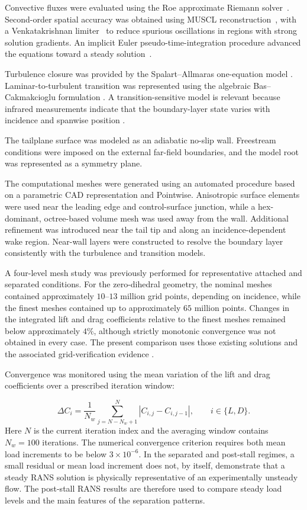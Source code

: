 \documentclass[journal ]{new-aiaa}
\begin{document}
Convective fluxes were evaluated using the Roe approximate Riemann solver~\citep{Roe1981}. Second-order spatial accuracy was obtained using MUSCL reconstruction~\citep{van1979towards}, with a Venkatakrishnan limiter~\citep{venkatakrishnan1993accuracy} to reduce spurious oscillations in regions with strong solution gradients. An implicit Euler pseudo-time-integration procedure advanced the equations toward a steady solution~\citep{palacios2013stanford}.

Turbulence closure was provided by the Spalart--Allmaras one-equation model \citep{spalart1992sa}. Laminar-to-turbulent transition was represented using the algebraic Bas--Cakmakcioglu formulation \citep{cakmakcioglu2020bcm}. A transition-sensitive model is relevant because infrared measurements indicate that the boundary-layer state varies with incidence and spanwise position \citep{ZanottiEtAl2022}.

The tailplane surface was modeled as an adiabatic no-slip wall. Freestream conditions were imposed on the external far-field boundaries, and the model root was represented as a symmetry plane.

The computational meshes were generated using an automated procedure based on a parametric CAD representation and Pointwise. Anisotropic surface elements were used near the leading edge and control-surface junction, while a hex-dominant, octree-based volume mesh was used away from the wall. Additional refinement was introduced near the tail tip and along an incidence-dependent wake region. Near-wall layers were constructed to resolve the boundary layer consistently with the turbulence and transition models.

A four-level mesh study was previously performed for representative attached and separated conditions. For the zero-dihedral geometry, the nominal meshes contained approximately $10$--$13$ million grid points, depending on incidence, while the finest meshes contained up to approximately $65$ million points. Changes in the integrated lift and drag coefficients relative to the finest meshes remained below approximately $4\%$, although strictly monotonic convergence was not obtained in every case. The present comparison uses those existing solutions and the associated grid-verification evidence \citep{rausa2026monnalisa}.

Convergence was monitored using the mean variation of the lift and drag coefficients over a prescribed iteration window:

%
\begin{equation}
\Delta C_i
=
\frac{1}{N_w}
\sum_{j=N-N_w+1}^{N}
\left|
C_{i,j}-C_{i,j-1}
\right|,
\qquad
i\in\{L,D\}.
\label{eq:load_convergence}
\end{equation}
%
Here $N$ is the current iteration index and the averaging window contains $N_w=100$ iterations. The numerical convergence criterion requires both mean load increments to be below $3\times10^{-6}$.
In the separated and post-stall regimes, a small residual or mean load increment does not, by itself, demonstrate that a steady RANS solution is physically representative of an experimentally unsteady flow.
The post-stall RANS results are therefore used to compare steady load levels and the main features of the separation patterns.
\end{document}

